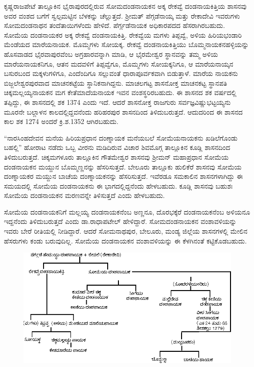 ಕೃಷ್ಣರಾಜಪೇಟೆ ತಾಲ್ಲೂಕಿನ ಭೈರಾಪುರದಲ್ಲಿರುವ ಸೋಮದಂಡನಾಯಕನ ಅಕ್ಕ ರೇಕವ್ವೆ ದಂಡನಾಯಕಿತ್ತಿಯ ಶಾಸನವು ಅವರ ವಂಶದ ಬಗೆಗೆ ಸ್ವಲ್ಪಮಟ್ಟಿನ ಬೆಳಕನ್ನು ಚೆಲ್ಲುತ್ತದೆ. ಶ‍್ರೀಮತ್​ ಪೆಗ್ಗಡೆನಾಯ್ಕ ಮತ್ತು ರೇಕಾದೇವಿ ಇವರುಗಳು ಸೋಮದಂಡನಾಥನ ತಂದೆತಾಯಿಗಳೆಂದು ಹೇಳಿದೆ. ಪೆರ್ಗ್ಗಡೆನಾಯಕ ಅಧಿಕಾರಪದದ ಹೆಸರಾಗಿರಬಹುದು. ಸೋಮೆಯ ದಂಡನಾಯಕರ ಅಕ್ಕ ರೇಕವ್ವೆ ದಂಡನಾಯಕಿತ್ತಿ. ರೇಕವ್ವೆಯ ಮಗಳು ತಿಪ್ಪವ್ವೆ, ಅಳಿಯ ಹಿರಿಯಭಂಡಾರಿ ಮೆಂಡೆಯದ ಮಾರೆಯನಾಯಕ. ಮೊಮ್ಮಗಳು ಸೋಯಕ್ಕ. ರೇಕವ್ವೆ ದಂಡನಾಯಕಿತ್ತಿಯು ಬೊಮ್ಮನಾಯಕನಹಳ್ಳಿಯನ್ನು ಹೊಸವಾಡದ ಭೈರವಾಪುರವೆಂಬ ಅಗ್ರಹಾರವನ್ನಾಗಿ ಮಾಡಿ, ಆ ಭೈರಮೇಶ್ವರ ಸ್ಥಾನವನ್ನು ತಮ್ಮ ಅಳಿಯ ಮಾರೆಯನಾಯಕ\-ನಿಗೂ, ಆತನ ಮದವಳಿಗೆ ತಿಪ್ಪವ್ವೆಗೂ, ಮೊಮ್ಮಗಳು ಸೋಯಕ್ಕನಿಗೂ, ಆ ಮಾರೆಯನಾಯ್ಕನ ಬಸುರಬಂದ ಮಕ್ಕಳುಗಳಿಗೂ, ಎಂದೆಂದಿಗೂ ಸಲ್ಲುವಂತೆ ಧಾರಾಪೂರ್ವಕವಾಗಿ ಬಿಡುತ್ತಾಳೆ. ಮಾರೆಯ ನಾಯಕನು ಬಿಜ್ಜಲೇಶ್ವರಪುರವಾದ ಮಾಚನಕಟ್ಟೆಯ ಸ್ಥಾನಿಕನಾಗಿದ್ದನು. ಮಾಚಲಗಟ್ಟ ಶಾಸನೋಕ್ತ ಮಾಚನಕಟ್ಟ ಸ್ಥಾನಪತಿ ಚಿಕ್ಕಮಲ್ಲಯ್ಯನಾಯಕನ ಮಗ ಕೇತೆಮಾದೆಯನಾಯಕ ಇವನ ವಂಶಸ್ಥರಿರಬಹುದು. ಈ ಶಾಸನದ ಶಕ ವರ್ಷದಲ್ಲಿ ತಪ್ಪಿದ್ದು, ಈ ಶಾಸನದಲ್ಲಿ ಶಕ 1374 ಎಂದು ಇದೆ. ಆದರೆ ಶಾಸನೋಕ್ತ ರಾಜಗುರು ಸರ್ವಜ್ಞವಿಷ್ಣುಭಟ್ಟಯ್ಯನು ಮೂರನೇ ಬಲ್ಲಾಳನ ಕಾಲದಲ್ಲಿದ್ದವನೆಂದು ಹರಿಹರಪುರ ಶಾಸನದಿಂದ ತಿಳಿದುಬರುತ್ತದೆ. ಆದುದರಿಂದ ಈ ಶಾಸನದ ಕಾಲ ಶಕ 1274 ಅಂದರೆ ಕ್ರಿ.ಶ.1352 ಆಗಿರಬಹುದು.

“ನಾರಸಿಂಹದೇವನ ಮನೆಯ ಹಿರಿಯಪ್ರಧಾನ ದಂಣ್ನಾಯಕ ಮನೆಯಬಲೆ ಸೋಮೆಯನಾಯಕನು ಖಡಿಲೆಗೊಂಡು ಬಹಲ್ಲಿ” ಹೋರಾಟ ನಡೆದು ಒಬ್ಬ ವೀರನು ಮಡಿದಿರುವ ವಿಚಾರ ಶಿವಮೊಗ್ಗ ತಾಲ್ಲೂಕಿನ ಕೂಡ್ಲಿ ಶಾಸನದಿಂದ ತಿಳಿದುಬರುತ್ತದೆ. ಚಿಕ್ಕಮಗಳೂರು ತಾಲ್ಲೂಕಿನ ಗೌತಮೇಶ್ವರ ಶಾಸನವು ಶ‍್ರೀಮನ್​ ಮಹಾಪ್ರಧಾನ ಸೋಮೆಯ ದಂಡನಾಯಕನ ಮಯ್ದುನ ಬೊಮ್ಮಣ್ಣನನ್ನು ಹೆಸರಿಸುತ್ತದೆ. ಬೇಲೂರು ತಾಲ್ಲೂಕು ಹುಲಿಕೆರೆ ಶಾಸನವು ಸೋಮೆಯ ದಂಣ್ನಾಯಕರ ಮಯ್ದುನ ಬಾಚೆಯ ದಂಣ್ನಾಯಕನನ್ನು ಹೆಸರಿಸುತ್ತದೆ. ಇವೆರಡೂ ಸಮಕಾಲಿನ ಶಾಸನಗಳಾಗಿದ್ದು ಈ ಸಮಯದಲ್ಲಿ ಸೋಮೆಯ ದಂಡನಾಯಕನು ಈ ಭಾಗದಲ್ಲಿದ್ದನೆಂದು ಹೇಳಬಹುದು. ಕೂಡ್ಲಿ ಶಾಸನವು ಬಹುಶಃ ಸೋಮೆಯ ದಂಡನಾಯಕನ ಮರಣವನ್ನೇ ತಿಳಿಸುತ್ತದೆ ಎಂದು ಹೇಳಬಹುದು.

ಸೋಮೆಯ ದಂಡನಾಯಕನಿಗೆ ಮಲ್ಲಯ್ಯ ದಂಡನಾಯಕನೆಂಬ ಅಣ್ಣನೂ, ದೊರಭಕ್ಕೆರೆ ದಂಡನಾಯಕನೆಂಬ ಅಳಿಯನೂ ಇದ್ದನೆಂದು ತಿಳಿದುಬರುತ್ತದೆ ಎಂದು ಡಾ.ರಾಧಾಪಟೇಲ್​ ಹೇಳಿದ್ದಾರೆ. ಸೋಮದಂಡನಾಯಕನ ವಂಶಾವಳಿಯನ್ನು ಇವರು ಬೇರೆ ರೀತಿಯಲ್ಲಿ ನೀಡಿದ್ದಾರೆ. ಆದರೆ ಸೋಮನಾಥಪುರ, ಬೇಲೂರು, ಮಂಡ್ಯ ಜಿಲ್ಲೆಯ ಶಾಸನಗಳಲ್ಲಿ ಮೇಲಿನ ಹೆಸರುಗಳು ಕಂಡು ಬರುವುದಿಲ್ಲ. ಸೋಮೆಯ ದಂಡನಾಯಕನ ವಂಶಾವಳಿಯನ್ನು ಈ ಕೆಳಗಿನಂತೆ ಕಟ್ಟಿಕೊಡಬಹುದು.

\begin{figure}[H]
\includegraphics{images/chap3/chap3fig21.jpeg}
\end{figure}

